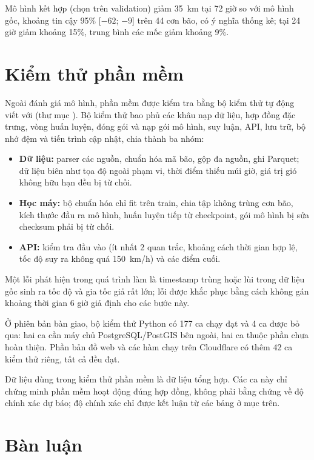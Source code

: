 Mô hình kết hợp (chọn trên validation) giảm 35~km tại 72 giờ so với mô hình
gốc, khoảng tin cậy 95\% [$-62$; $-9$] trên 44 cơn bão, có ý nghĩa thống kê;
tại 24 giờ giảm khoảng 15\%, trung bình các mốc giảm khoảng 9\%.

\section{Kiểm thử phần mềm}

Ngoài đánh giá mô hình, phần mềm được kiểm tra bằng bộ kiểm thử tự động viết
với  (thư mục ). Bộ kiểm thử bao phủ các khâu nạp dữ
liệu, hợp đồng đặc trưng, vòng huấn luyện, đóng gói và nạp gói mô hình, suy
luận, API, lưu trữ, bộ nhớ đệm và tiến trình cập nhật, chia thành ba nhóm:
\begin{itemize}[leftmargin=1.6em, itemsep=2pt]
  \item \textbf{Dữ liệu:} parser các nguồn, chuẩn hóa mã bão, gộp đa nguồn, ghi
        Parquet; dữ liệu biên như tọa độ ngoài phạm vi, thời điểm thiếu múi giờ,
        giá trị gió không hữu hạn đều bị từ chối.
  \item \textbf{Học máy:} bộ chuẩn hóa chỉ fit trên train, chia tập không trùng
        cơn bão, kích thước đầu ra mô hình, huấn luyện tiếp từ checkpoint, gói mô
        hình bị sửa checksum phải bị từ chối.
  \item \textbf{API:} kiểm tra đầu vào (ít nhất 2 quan trắc, khoảng cách thời
        gian hợp lệ, tốc độ suy ra không quá 150~km/h) và các điểm cuối.
\end{itemize}

Một lỗi phát hiện trong quá trình làm là timestamp trùng hoặc lùi trong dữ
liệu gốc sinh ra tốc độ và gia tốc giả rất lớn; lỗi được khắc phục bằng cách
không gán khoảng thời gian 6 giờ giả định cho các bước này.

Ở phiên bản bàn giao, bộ kiểm thử Python
có 177 ca chạy đạt và 4 ca được bỏ qua: hai ca cần máy chủ PostgreSQL/PostGIS
bên ngoài, hai ca thuộc phần chưa hoàn thiện. Phần bản đồ web và các hàm chạy
trên Cloudflare có thêm 42 ca kiểm thử riêng, tất cả đều đạt.

Dữ liệu dùng trong kiểm thử phần mềm là dữ liệu tổng hợp. Các ca này chỉ
chứng minh phần mềm hoạt động đúng hợp đồng, không phải bằng chứng về độ
chính xác dự báo; độ chính xác chỉ được kết luận từ các bảng ở mục trên.

\section{Bàn luận}

